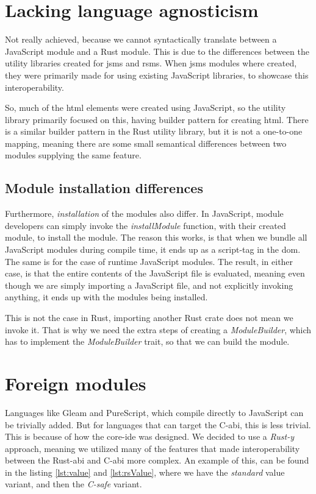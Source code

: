 \section{Lacking language agnosticism} \label{sec:lla}

Not really achieved, because we cannot syntactically translate between a
JavaScript module and a Rust module. This is due to the differences between the
utility libraries created for \gls*{jsms} and \gls*{rsms}. When \gls*{jsms} modules
where created, they were primarily made for using existing JavaScript libraries,
to showcase this interoperability.

So, much of the \gls*{html} elements were created using JavaScript, so the
utility library primarily focused on this, having builder pattern for creating
\gls*{html}. There is a similar builder pattern in the Rust utility library, but
it is not a one-to-one mapping, meaning there are some small semantical
differences between two modules supplying the same feature.


\subsection{Module installation differences}

Furthermore, \textit{installation} of the modules also differ. In JavaScript,
module developers can simply invoke the \textit{installModule} function, with
their created module, to install the module. The reason this works, is that when
we bundle all JavaScript modules during compile time, it ends up as a script-tag
in the \gls*{dom}. The same is for the case of runtime JavaScript modules.
The result, in either case, is that the entire contents of the JavaScript file
is evaluated, meaning even though we are simply importing a JavaScript file, and
not explicitly invoking anything, it ends up with the modules being installed.

This is not the case in Rust, importing another Rust crate does not mean we
invoke it. That is why we need the extra steps of creating a
\textit{ModuleBuilder}, which has to implement the \textit{ModuleBuilder} trait,
so that we can build the module.


\section{Foreign modules} \label{sec:fm}

Languages like Gleam and PureScript, which compile directly to JavaScript can
be trivially added. But for languages that can target the C-\gls*{abi}, this is
less trivial. This is because of how the core-\gls*{ide} was designed. We decided
to use a \textit{Rust-y} approach, meaning we utilized many of the features that
made interoperability between the Rust-\gls*{abi} and C-\gls*{abi} more complex.
An example of this, can be found in the listing \ref{lst:value} and
\ref{lst:rsValue}, where we have the \textit{standard} value variant, and then
the \textit{C-safe} variant.

